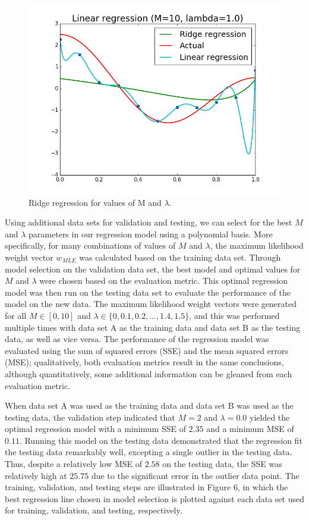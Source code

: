 \documentclass{article}
\begin{document}
\begin{figure}[width=\linewidth]
\begin{multicols}{2}
  \includegraphics[width=1.2\linewidth]{code/P3/ridge_regression,10,1.png}
\end{multicols}
\caption{Ridge regression for values of M and $\lambda$.}
\end{figure}

Using additional data sets for validation and testing, we can select for the best $M$ and $\lambda$ parameters in our regression model using a polynomial basis. More specifically, for many combinations of values of $M$ and $\lambda$, the maximum likelihood weight vector $w_{MLE}$ was calculated based on the training data set. Through model selection on the validation data set, the best model and optimal values for $M$ and $\lambda$ were chosen based on the evaluation metric. This optimal regression model was then run on the testing data set to evaluate the performance of the model on the new data. The maximum likelihood weight vectors were generated for all $M \in [0, 10]$ and $\lambda \in \{0, 0.1, 0.2, ..., 1.4, 1.5\}$, and this was performed multiple times with data set A as the training data and data set B as the testing data, as well as vice versa. The performance of the regression model was evaluated using the sum of squared errors (SSE) and the mean squared errors (MSE); qualitatively, both evaluation metrics result in the same conclusions, although quantitatively, some additional information can be gleaned from each evaluation metric.

When data set A was used as the training data and data set B was used as the testing data, the validation step indicated that $M = 2$ and $\lambda=0.0$ yielded the optimal regression model with a minimum SSE of $2.35$ and a minimum MSE of $0.11$. Running this model on the testing data demonstrated that the regression fit the testing data remarkably well, excepting a single outlier in the testing data. Thus, despite a relatively low MSE of $2.58$ on the testing data, the SSE was relatively high at $25.75$ due to the significant error in the outlier data point. The training, validation, and testing steps are illustrated in Figure 6, in which the best regression line chosen in model selection is plotted against each data set used for training, validation, and testing, respectively.
\end{document}
